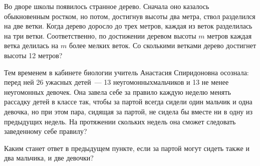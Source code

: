 ﻿
\begin{itemize}

\itA Во дворе школы появилось странное дерево. Сначала оно казалось обыкновенным ростком, но потом, достигнув высоты два метра, ствол разделился на две ветки. Когда дерево доросло до трех метров, каждая из веток разделилась на три ветки. Соответственно, по достижении деревом высоты $m$ метров каждая ветка делилась на $m$ более мелких веток. Со сколькими ветками дерево достигнет высоты 12 метров?

\itB Тем временем в кабинете биологии учитель Анастасия Спиридоновна осознала: перед ней 26 ужасных детей~— 13 неугомонных\linebreak мальчиков и 13 не менее неугомонных девочек. Она завела себе за правило каждую неделю менять рассадку детей в классе так, чтобы за партой всегда сидели один мальчик и одна девочка, но при этом пара, сидящая за партой, не сидела бы вместе ни в одну из предыдущих недель. На протяжении скольких недель она сможет следовать заведенному себе правилу?

\itC Каким станет ответ в предыдущем пункте, если за партой могут сидеть также и два мальчика, и две девочки?
\end{itemize}